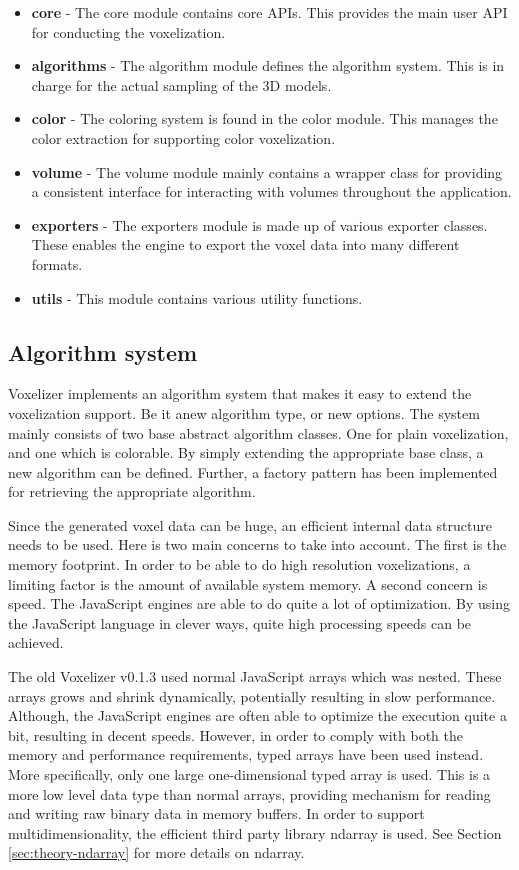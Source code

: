 \begin{itemize}
    \item \textbf{core} - The core module contains core APIs. This provides the main user API for conducting the voxelization.
    \item \textbf{algorithms} - The algorithm module defines the algorithm system. This is in charge for the actual sampling of the 3D models.
    \item \textbf{color} - The coloring system is found in the color module. This manages the color extraction for supporting color voxelization.
    \item \textbf{volume} - The volume module mainly contains a wrapper class for providing a consistent interface for interacting with volumes throughout the application.  
    \item \textbf{exporters} - The exporters module is made up of various exporter classes. These enables the engine to export the voxel data into many different formats.
    \item \textbf{utils} - This module contains various utility functions.
\end{itemize}

\subsection{Algorithm system}
\label{sec:method-algorithm-system}
Voxelizer implements an algorithm system that makes it easy to extend the voxelization support. Be it anew algorithm type, or new options. The system mainly consists of two base abstract algorithm classes. One for plain voxelization, and one which is colorable. By simply extending the appropriate base class, a new algorithm can be defined. Further, a factory pattern has been implemented for retrieving the appropriate algorithm.

Since the generated voxel data can be huge, an efficient internal data structure needs to be used. Here is two main concerns to take into account. The first is the memory footprint. In order to be able to do high resolution voxelizations, a limiting factor is the amount of available system memory. A second concern is speed. The JavaScript engines are able to do quite a lot of optimization. By using the JavaScript language in clever ways, quite high processing speeds can be achieved.

The old Voxelizer v0.1.3 used normal JavaScript arrays which was nested. These arrays grows and shrink dynamically, potentially resulting in slow performance. Although, the JavaScript engines are often able to optimize the execution quite a bit, resulting in decent speeds. However, in order to comply with both the memory and performance requirements, typed arrays have been used instead. More specifically, only one large one-dimensional typed array is used. This is a more low level data type than normal arrays, providing mechanism for reading and writing raw binary data in memory buffers. In order to support multidimensionality, the efficient third party library ndarray is used. See Section \ref{sec:theory-ndarray} for more details on ndarray.

